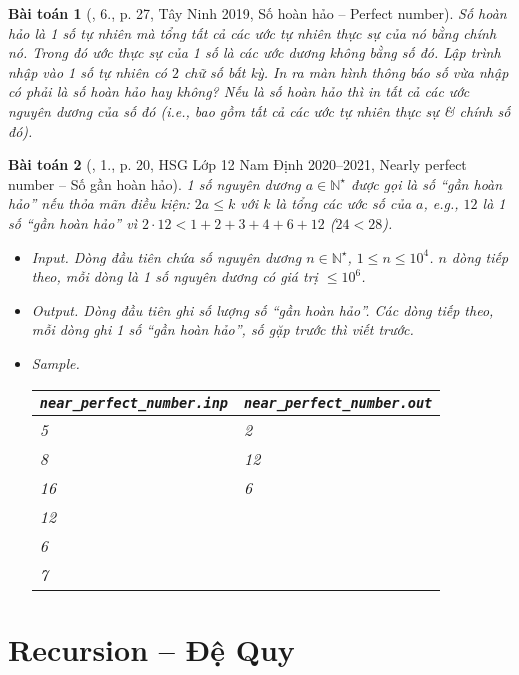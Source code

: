 \documentclass{article}
\newtheorem{baitoan}{Bài toán}
\begin{document}
\begin{baitoan}[\cite{VietSTEM2021}, 6., p. 27, Tây Ninh 2019, Số hoàn hảo -- Perfect number]
	\emph{Số hoàn hảo} là 1 số tự nhiên mà tổng tất cả các ước tự nhiên thực sự của nó bằng chính nó. Trong đó ước thực sự của 1 số là các ước dương không bằng số đó. Lập trình nhập vào 1 số tự nhiên có $2$ chữ số bất kỳ. In ra màn hình thông báo số vừa nhập có phải là số hoàn hảo hay không? Nếu là số hoàn hảo thì in tất cả các ước nguyên dương của số đó (i.e., bao gồm tất cả các ước tự nhiên thực sự \& chính số đó).
\end{baitoan}

\begin{baitoan}[\cite{Trung_HSG_THPT_Tin}, 1., p. 20, HSG Lớp 12 Nam Định 2020--2021, Nearly perfect number -- Số gần hoàn hảo]
	1 số nguyên dương $a\in\mathbb{N}^\star$ được gọi là {\rm số ``gần hoàn hảo''} nếu thỏa mãn điều kiện: $2a\le k$ với $k$ là tổng các ước số của $a$, e.g., $12$ là 1 số ``gần hoàn hảo'' vì $2\cdot12 < 1 + 2 + 3 + 4 + 6 + 12$ ($24 < 28$).
	\begin{itemize}
		\item {\sf Input.} Dòng đầu tiên chứa số nguyên dương $n\in\mathbb{N}^\star$, $1\le n\le10^4$. $n$ dòng tiếp theo, mỗi dòng là 1 số nguyên dương có giá trị $\le10^6$.
		\item {\sf Output.} Dòng đầu tiên ghi số lượng số ``gần hoàn hảo''. Các dòng tiếp theo, mỗi dòng ghi 1 số ``gần hoàn hảo'', số gặp trước thì viết trước.
		\item {\sf Sample.}
		\begin{table}[H]
			\centering
			\begin{tabular}{|l|l|}
				\hline
				\verb|near_perfect_number.inp| & \verb|near_perfect_number.out| \\
				\hline
				5 & 2 \\
				8 & 12 \\
				16 & 6 \\
				12 & \\
				6 & \\
				7 & \\
				\hline
			\end{tabular}
		\end{table}
	\end{itemize}
\end{baitoan}


\section{Recursion -- Đệ Quy}
\end{document}
